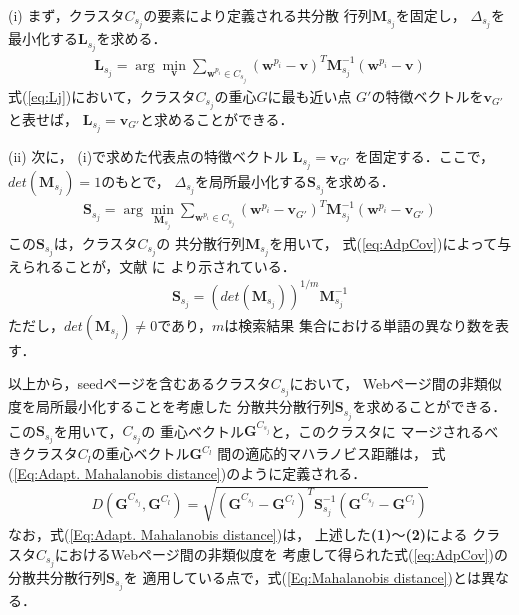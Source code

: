 \documentclass[japanese]{jnlp_1.4}
\begin{document}
\noindent
(i) まず，クラスタ$C_{s_{j}}$の要素により定義される共分散
行列$\boldsymbol{M}_{s_{j}}$を固定し，
$\Delta_{s_{j}}$を最小化する$\boldsymbol{L}_{s_{j}}$を求める．
\begin{eqnarray}
\boldsymbol{L}_{s_{j}}=
\arg\min_{\boldsymbol{v}}\sum_{\boldsymbol{w}^{p_{i}}\in C_{s_{j}}}
(\boldsymbol{w}^{p_{i}}-\boldsymbol{v})^{T}\boldsymbol{M}_{s_{j}}^{-1}(\boldsymbol{w}^{p_{i}}-\boldsymbol{v}) \label{eq:Lj}
\end{eqnarray}
式(\ref{eq:Lj})において，クラスタ$C_{s_{j}}$の重心$G$に最も近い点
$G'$の特徴ベクトルを$\boldsymbol{v}_{G'}$と表せば，
$\boldsymbol{L}_{s_{j}}=\boldsymbol{v}_{G'}$と求めることができる．

\noindent
(ii) 次に，
(i)で求めた代表点の特徴ベクトル
$\boldsymbol{L}_{s_{j}}=\boldsymbol{v}_{G'}$
を固定する．ここで，
$det(\boldsymbol{M}_{s_{j}})=1$のもとで，
$\Delta_{s_{j}}$を局所最小化する$\boldsymbol{S}_{s_{j}}$を求める．
\begin{eqnarray}
\boldsymbol{S}_{s_{j}}=\arg\min_{\boldsymbol{M}_{s_{j}}}\sum_{\boldsymbol{w}^{p_{i}}\in C_{s_{j}}}
(\boldsymbol{w}^{p_{i}}-\boldsymbol{v}_{G'})^{T}
\boldsymbol{M}_{s_{j}}^{-1}(\boldsymbol{w}^{p_{i}}-\boldsymbol{v}_{G'}) \label{eq:dj}
\end{eqnarray}
この$\boldsymbol{S}_{s_{j}}$は，クラスタ$C_{s_{j}}$の
共分散行列$\boldsymbol{M}_{s_{j}}$を用いて，
式(\ref{eq:AdpCov})によって与えられることが，文献 \cite{Diday77} に
より示されている．
\pagebreak
\begin{eqnarray}
\boldsymbol{S}_{s_{j}}=(det(\boldsymbol{M}_{s_{j}}))^{1/m}\boldsymbol{M}_{s_{j}}^{-1}
\label{eq:AdpCov}
\end{eqnarray}
ただし，$det(\boldsymbol{M}_{s_{j}}) \neq 0$であり，$m$は検索結果
集合における単語の異なり数を表す．

以上から，seedページを含むあるクラスタ$C_{s_{j}}$において，
Webページ間の非類似度を局所最小化することを考慮した
分散共分散行列$\boldsymbol{S}_{s_{j}}$を求めることができる．
この$\boldsymbol{S}_{s_{j}}$を用いて，$C_{s_{j}}$の
重心ベクトル$\boldsymbol{G}^{C_{s_{j}}}$と，このクラスタに
マージされるべきクラスタ$C_{l}$の重心ベクトル$\boldsymbol{G}^{C_{l}}$
間の適応的マハラノビス距離は，
式(\ref{Eq:Adapt. Mahalanobis distance})のように定義される．
\begin{eqnarray}
D(\boldsymbol{G}^{C_{s_{j}}},\boldsymbol{G}^{C_{l}})=
\sqrt{(\boldsymbol{G}^{C_{s_{j}}}-\boldsymbol{G}^{C_{l}})^{T}\boldsymbol{S}_{s_{j}}^{-1}(\boldsymbol{G}^{C_{s_{j}}}-\boldsymbol{G}^{C_{l}})} \label{Eq:Adapt. Mahalanobis distance}
\end{eqnarray}
なお，式(\ref{Eq:Adapt. Mahalanobis distance})は，
上述した\textbf{(1)}〜\textbf{(2)}による
クラスタ$C_{s_{j}}$におけるWebページ間の非類似度を
考慮して得られた式(\ref{eq:AdpCov})の
分散共分散行列$\boldsymbol{S}_{s_{j}}$を
適用している点で，式(\ref{Eq:Mahalanobis distance})とは異なる．
\end{document}
